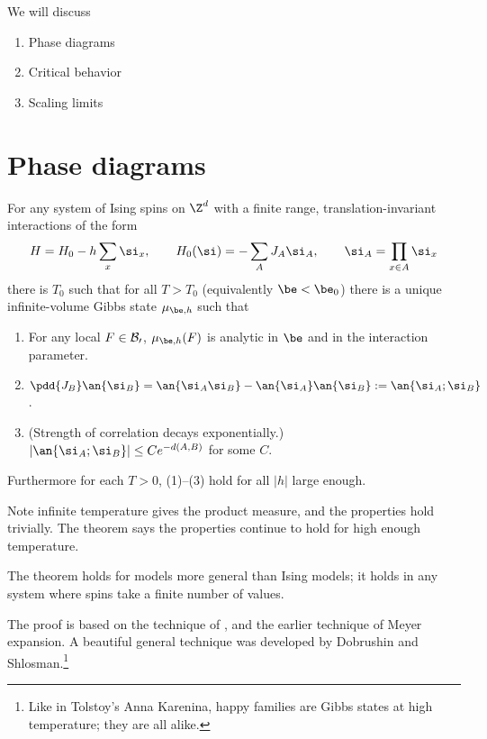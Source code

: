 

We will discuss
\begin{enumerate}
\item
Phase diagrams
\item
Critical behavior
\item
Scaling limits
\end{enumerate}

\section{Phase diagrams}

\begin{thm}
For any system of Ising spins on $\Z^d$ with a finite range, translation-invariant interactions of the form
\[
H=H_0 - h\sum_x \si_x,\qquad H_0(\si) = -\sum_A J_A\si_A, \qquad \si_A=\prod_{x\in A}\si_x
\]
there is $T_0$ such that for all $T>T_0$ (equivalently $\be<\be_0$) there is a unique infinite-volume Gibbs state $\mu_{\be, h}$ such that
\begin{enumerate}
\item
For any local $F\in \cal B_0$, $\mu_{\be,h}(F)$ is analytic in $\be$ and in the interaction parameter.
\item
$\pdd{J_B} \an{\si_B} = \an{\si_A\si_B} - \an{\si_A}\an{\si_B} :=\an{\si_A;\si_B}$.
\item
(Strength of correlation decays exponentially.) $|\an{\si_A;\si_B}|\le Ce^{-d(A,B)}$ for some $C$.
\end{enumerate}
Furthermore for each $T>0$, (1)--(3) hold for all $|h|$ large enough.
\end{thm}

Note infinite temperature gives the product measure, and the properties hold trivially. The theorem says the properties continue to hold for high enough temperature.

The theorem holds for models more general than Ising models; it holds in any system where spins take a finite number of values.


The proof is based on the technique of , and the earlier technique of Meyer expansion. A beautiful general technique was developed by Dobrushin %
and Shlosman.\footnote{Like in Tolstoy's Anna Karenina, happy families are Gibbs states at high temperature; they are all alike.}

